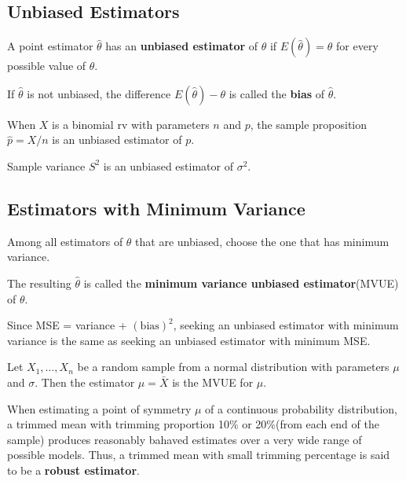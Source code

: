 \subsection{Unbiased Estimators}

\begin{definition}
    A point estimator $\hat{\theta}$ has an \textbf{unbiased estimator} of $\theta$ if $E(\hat{\theta})=\theta$ for every possible value of $\theta$. 
    
    If $\hat{\theta}$ is not unbiased, the difference $E(\hat{\theta}) - \theta$ is called the \textbf{bias} of $\hat{\theta}$.
\end{definition}

\begin{proposition}
    When $X$ is a binomial rv with parameters $n$ and $p$, the sample proposition $\hat{p}=X/n$ is an unbiased estimator of $p$. 
\end{proposition}

Sample variance $S^2$ is an unbiased estimator of $\sigma^2$.

\subsection{Estimators with Minimum Variance}

\begin{definition}
    Among all estimators of $\theta$ that are unbiased, choose the one that has minimum variance.

    The resulting $\hat{\theta}$ is called the \textbf{minimum variance unbiased estimator}(MVUE) of $\theta$. 

    Since MSE = variance + $(\text{bias})^2$, seeking an unbiased estimator with minimum variance is the same as seeking an unbiased estimator with minimum MSE.
\end{definition}

\begin{theorem}
    Let $X_1,\dots,X_n$ be a random sample from a normal distribution with parameters $\mu$ and $\sigma$. Then the estimator $\hat{\mu} = \bar{X}$ is the MVUE for $\mu$.
\end{theorem}

When estimating a point of symmetry $\mu$ of a continuous probability distribution, a trimmed mean with trimming proportion 10\% or 20\%(from each end of the sample) produces reasonably bahaved estimates over a very wide range of possible models. Thus, a trimmed mean with small trimming percentage is said to be a \textbf{robust estimator}.

